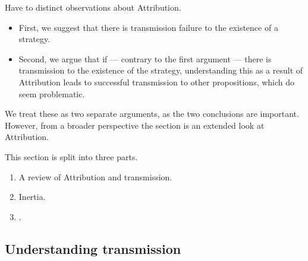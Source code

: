 \documentclass[10pt]{article}
\newcommand{\AR}[0]{\textsf{Attribution}}
\begin{document}
\begin{note}
  Have to distinct observations about \AR.
  \begin{itemize}
  \item First, we suggest that there is transmission failure to the existence of a strategy.
  \item Second, we argue that if --- contrary to the first argument --- there is transmission to the existence of the strategy, understanding this as a result of \AR{} leads to successful transmission to other propositions, which do seem problematic.
  \end{itemize}
  We treat these as two separate arguments, as the two conclusions are important.
  However, from a broader perspective the section is an extended look at \AR.
\end{note}

\begin{note}[Structure]
  This section is split into three parts.
  \begin{enumerate}
  \item A review of \AR{} and transmission.
  \item Inertia.
  \item \citeauthor{Wright:2016wl}.
  \end{enumerate}
\end{note}

\subsection{Understanding transmission}
\label{sec:underst-transm}
\end{document}
